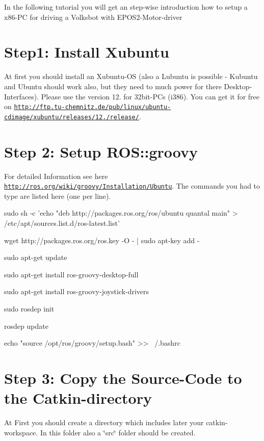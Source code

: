 In the following tutorial you will get an step-\/wise introduction how to setup a x86-\/\-P\-C for driving a Volksbot with E\-P\-O\-S2-\/\-Motor-\/driver\hypertarget{setup_setup_step1}{}\section{Step1\-: Install Xubuntu}\label{setup_setup_step1}
At first you should install an Xubuntu-\/\-O\-S (also a Lubuntu is possible -\/ Kubuntu and Ubuntu should work also, but they need to much power for there Desktop-\/\-Interfaces). Please use the version 12. for 32bit-\/\-P\-Cs (i386). You can get it for free on \href{http://ftp.tu-chemnitz.de/pub/linux/ubuntu-cdimage/xubuntu/releases/12.10/release/}{\tt http\-://ftp.\-tu-\/chemnitz.\-de/pub/linux/ubuntu-\/cdimage/xubuntu/releases/12./release/}.\hypertarget{setup_setup_step2}{}\section{Step 2\-: Setup R\-O\-S\-::groovy}\label{setup_setup_step2}
For detailed Information see here \href{http://ros.org/wiki/groovy/Installation/Ubuntu}{\tt http\-://ros.\-org/wiki/groovy/\-Installation/\-Ubuntu}. The commands you had to type are listed here (one per line).

\begin{DoxyVerb}sudo sh -c 'echo "deb http://packages.ros.org/ros/ubuntu quantal main" > /etc/apt/sources.list.d/ros-latest.list'

wget http://packages.ros.org/ros.key -O - | sudo apt-key add -

sudo apt-get update

sudo apt-get install ros-groovy-desktop-full

sudo apt-get install ros-groovy-joystick-drivers

sudo rosdep init

rosdep update

echo "source /opt/ros/groovy/setup.bash" >> ~/.bashrc
\end{DoxyVerb}
\hypertarget{setup_setup_step3}{}\section{Step 3\-: Copy the Source-\/\-Code to the Catkin-\/directory}\label{setup_setup_step3}
At First you should create a directory which includes later your catkin-\/workspace. In this folder also a \char`\"{}src\char`\"{} folder should be created.

